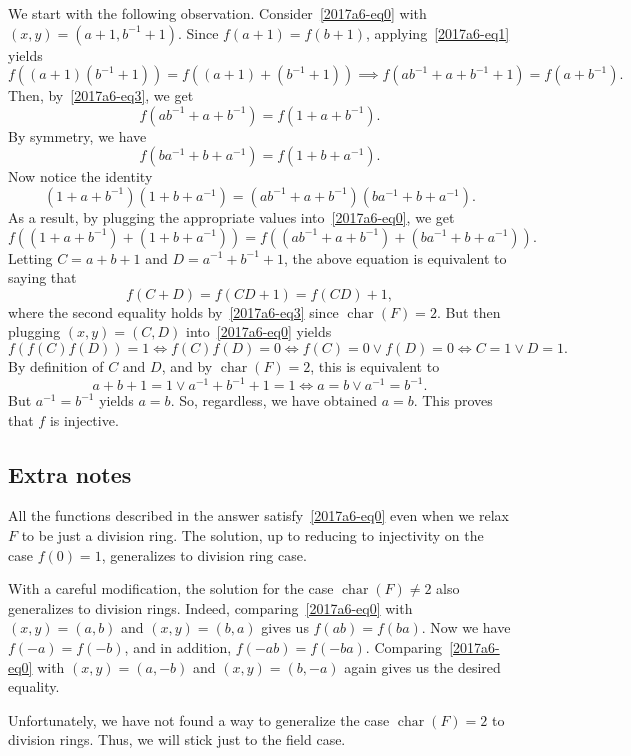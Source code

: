 \documentclass{article}
\DeclareMathOperator{\rchar}{char}
\begin{document}
We start with the following observation.
Consider~\eqref{2017a6-eq0} with $(x, y) = (a + 1, b^{-1} + 1)$.
Since $f(a + 1) = f(b + 1)$, applying~\eqref{2017a6-eq1} yields
\[ f((a + 1)(b^{-1} + 1)) = f((a + 1) + (b^{-1} + 1)) \implies f(ab^{-1} + a + b^{-1} + 1) = f(a + b^{-1}). \]
Then, by~\eqref{2017a6-eq3}, we get
\[ f(ab^{-1} + a + b^{-1}) = f(1 + a + b^{-1}). \]
By symmetry, we have
\[ f(ba^{-1} + b + a^{-1}) = f(1 + b + a^{-1}). \]
Now notice the identity
\[ (1 + a + b^{-1})(1 + b + a^{-1}) = (ab^{-1} + a + b^{-1})(ba^{-1} + b + a^{-1}). \]
As a result, by plugging the appropriate values into~\eqref{2017a6-eq0}, we get
\[ f((1 + a + b^{-1}) + (1 + b + a^{-1})) = f((ab^{-1} + a + b^{-1}) + (ba^{-1} + b + a^{-1})). \]
Letting $C = a + b + 1$ and $D = a^{-1} + b^{-1} + 1$, the above equation is equivalent to saying that
\[ f(C + D) = f(CD + 1) = f(CD) + 1, \]
    where the second equality holds by~\eqref{2017a6-eq3} since $\rchar(F) = 2$.
But then plugging $(x, y) = (C, D)$ into~\eqref{2017a6-eq0} yields
\[ f(f(C) f(D)) = 1 \iff f(C) f(D) = 0 \iff f(C) = 0 \vee f(D) = 0 \iff C = 1 \vee D = 1. \]
By definition of $C$ and $D$, and by $\rchar(F) = 2$, this is equivalent to
\[ a + b + 1 = 1 \vee a^{-1} + b^{-1} + 1 = 1 \iff a = b \vee a^{-1} = b^{-1}. \]
But $a^{-1} = b^{-1}$ yields $a = b$.
So, regardless, we have obtained $a = b$.
This proves that $f$ is injective.



\subsection*{Extra notes}

All the functions described in the answer satisfy~\eqref{2017a6-eq0} even when we relax $F$ to be just a division ring.
The solution, up to reducing to injectivity on the case $f(0) = 1$, generalizes to division ring case.

With a careful modification, the solution for the case $\rchar(F) \neq 2$ also generalizes to division rings.
Indeed, comparing~\eqref{2017a6-eq0} with $(x, y) = (a, b)$ and $(x, y) = (b, a)$ gives us $f(ab) = f(ba)$.
Now we have $f(-a) = f(-b)$, and in addition, $f(-ab) = f(-ba)$.
Comparing~\eqref{2017a6-eq0} with $(x, y) = (a, -b)$ and $(x, y) = (b, -a)$ again gives us the desired equality.

Unfortunately, we have not found a way to generalize the case $\rchar(F) = 2$ to division rings.
Thus, we will stick just to the field case.
\end{document}
